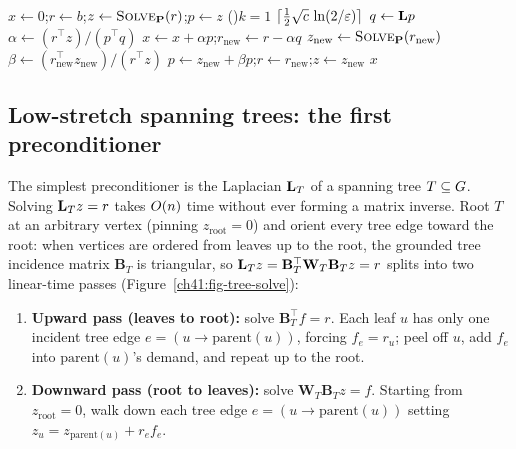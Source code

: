 \begin{algorithm}[htbp]
\DontPrintSemicolon
\caption{\textsc{PreconditionedSolve}$(\Lap,b,\mathbf{P},\eps)$}\label{ch41:alg-pcg}
$x\gets 0$;\quad $r\gets b$;\quad $z\gets \textsc{Solve}_{\mathbf{P}}(r)$;\quad $p\gets z$\;
\For(){$k=1$ \KwTo $\lceil\tfrac12\sqrt{c}\,\ln(2/\varepsilon)\rceil$}{
  $q\gets \mathbf{L} p$\;
  $\alpha\gets (r^\top z)/(p^\top q)$\;
  $x\gets x+\alpha p$;\quad $r_{\mathrm{new}}\gets r-\alpha q$\;
  $z_{\mathrm{new}}\gets \textsc{Solve}_{\mathbf{P}}(r_{\mathrm{new}})$\;
  $\beta\gets (r_{\mathrm{new}}^\top z_{\mathrm{new}})/(r^\top z)$\;
  $p\gets z_{\mathrm{new}}+\beta p$;\quad $r\gets r_{\mathrm{new}}$;\quad $z\gets z_{\mathrm{new}}$\;
}
\Return $x$\;
\end{algorithm}

\subsection{Low-stretch spanning trees: the first preconditioner}\label{ch41:lsst}

The simplest preconditioner is the Laplacian $\mathbf{L}_T$ of a spanning tree $T \subseteq G$. Solving $\mathbf{L}_T z = r$ takes $O(n)$ time without ever forming a matrix inverse. Root $T$ at an arbitrary vertex (pinning $z_{\mathrm{root}} = 0$) and orient every tree edge toward the root: when vertices are ordered from leaves up to the root, the grounded tree incidence matrix $\mathbf{B}_T$ is triangular, so $\mathbf{L}_T z = \mathbf{B}_T^\top \mathbf{W}_T \mathbf{B}_T z = r$ splits into two linear-time passes (Figure~\ref{ch41:fig-tree-solve}):
\begin{enumerate}
  \item \textbf{Upward pass (leaves to root):} solve $\mathbf{B}_T^\top f = r$. Each leaf $u$ has only one incident tree edge $e=(u\to \mathrm{parent}(u))$, forcing $f_e = r_u$; peel off $u$, add $f_e$ into $\mathrm{parent}(u)$'s demand, and repeat up to the root.
  \item \textbf{Downward pass (root to leaves):} solve $\mathbf{W}_T \mathbf{B}_T z = f$. Starting from $z_{\mathrm{root}} = 0$, walk down each tree edge $e=(u\to \mathrm{parent}(u))$ setting $z_u = z_{\mathrm{parent}(u)} + r_e f_e$.
\end{enumerate}

